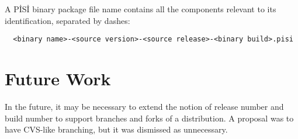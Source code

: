 \documentclass[a4paper,11pt]{article}
\begin{document}
A P\.IS\.I binary package file name contains all the components relevant
to its identification, separated by dashes:
\begin{verbatim}
  <binary name>-<source version>-<source release>-<binary build>.pisi
\end{verbatim}

\section{Future Work}

In the future, it may be necessary to extend the notion of release
number and build number to support branches and forks of a
distribution. A proposal was to have CVS-like branching, but it
was dismissed as unnecessary.
\end{document}

